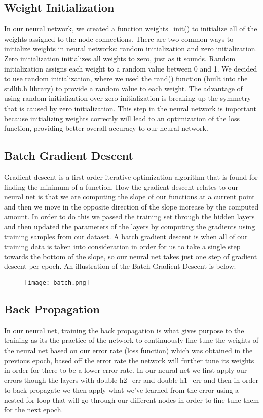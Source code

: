 \documentclass[twoside,twocolumn]{article}
\begin{document}
\subsection{Weight Initialization}
In our neural network, we created a function weights\_init() to initialize all of the weights assigned to the node connections. There are two common ways to initialize weights in neural networks: random initialization and zero initialization. Zero initialization initializes all weights to zero, just as it sounds. Random initialization assigns each weight to a random value between 0 and 1. We decided to use random initialization, where we used the rand() function (built into the stdlib.h library) to provide a random value to each weight. The advantage of using random initialization over zero initialization is breaking up the symmetry that is caused by zero initialization. This step in the neural network is important because initializing weights correctly will lead to an optimization of the loss function, providing better overall accuracy to our neural network.

\subsection{Batch Gradient Descent}
Gradient descent is a first order iterative optimization algorithm that is found for finding the minimum of a function. How the gradient descent relates to our neural net is that we are computing the slope of our functions at a current point and then we move in the opposite direction of the slope increase by the computed amount. In order to do this we passed the training set through the hidden layers and then updated the parameters of the layers by computing the gradients using training samples from our dataset. A batch gradient descent is when all of our training data is taken into consideration in order for us to take a single step towards the bottom of the slope, so our neural net takes just one step of gradient descent per epoch. An illustration of the Batch Gradient Descent is below:
\begin{figure}[h]
    \centering
    \texttt{[image: batch.png]}
\end{figure}

\subsection{Back Propagation}
In our neural net, training the back propagation is what gives purpose to the training as its the practice of the network to continuously fine tune the weights of the neural net based on our error rate (loss function) which was obtained in the previous epoch, based off the error rate the network will further tune its weights in order for there to be a lower error rate. In our neural net we first apply our errors though the layers with double h2\_err and  double h1\_err and then in order to back propagate we then apply what we’ve learned from the error using a nested for loop that will go through our different nodes in order to fine tune them for the next epoch.\\
\end{document}
